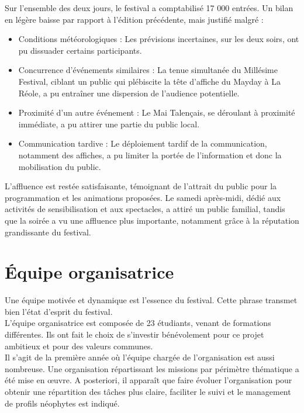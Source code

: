 \documentclass[12pt,a4paper]{report}
\begin{document}
Sur l'ensemble des deux jours, le festival a comptabilisé 17 000 entrées. Un bilan en légère baisse par rapport à l'édition précédente, mais justifié malgré :
\begin{itemize}
\item Conditions météorologiques : Les prévisions incertaines, sur les deux soirs, ont pu dissuader certains participants.
\item Concurrence d'événements similaires : La tenue simultanée du Millésime Festival, ciblant un public qui plébiscite la tête d’affiche du Mayday à La Réole, a pu entraîner une dispersion de l'audience potentielle.
\item Proximité d'un autre événement : Le Mai Talençais, se déroulant à proximité immédiate, a pu attirer une partie du public local.
\item Communication tardive : Le déploiement tardif de la communication, notamment des affiches, a pu limiter la portée de l'information et donc la mobilisation du public.\\
\end{itemize}
L'affluence est restée satisfaisante, témoignant de l'attrait du public pour la programmation  et les animations proposées. Le samedi après-midi, dédié aux activités de sensibilisation et aux spectacles, a attiré un public familial, tandis que la soirée a vu une affluence plus importante, notamment grâce à la réputation grandissante du festival.

\chapter{Équipe organisatrice}

Une équipe motivée et dynamique est l'essence du festival. Cette phrase transmet bien l’état d’esprit du festival.\\

L’équipe organisatrice est composée de 23 étudiants, venant de formations différentes. Ils ont fait le choix de s’investir bénévolement pour ce projet ambitieux et pour des valeurs communes.\\

Il s'agit de la première année où l'équipe chargée de l'organisation est aussi nombreuse. Une organisation répartissant les missions par périmètre thématique a été mise en œuvre. A posteriori, il apparaît que faire évoluer l'organisation pour obtenir une répartition des tâches plus claire, faciliter le suivi et le management de profils néophytes est indiqué.\\
\end{document}
